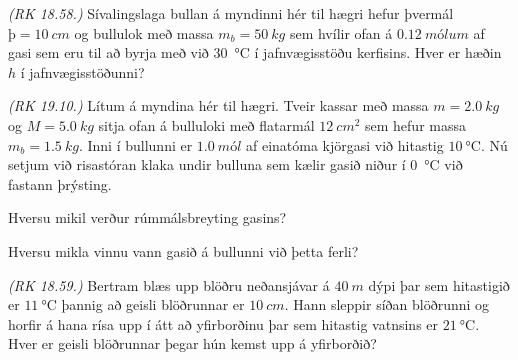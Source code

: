 \ifdefined \wholebook \else\documentclass[oneside]{book}\usepackage{EdlBook}\graphicspath{{figures/}}
\begin{document}
\begin{enumerate}[label = \textbf{Dæmi \thechapter.\arabic*.}]
\begin{minipage}{\linewidth}
\item \textit{(RK 18.58.)} Sívalingslaga bullan á myndinni hér til hægri hefur þvermál $þ = \SI{10}{cm}$ og bullulok með massa $m_b = \SI{50}{kg}$ sem hvílir ofan á $\SI{0.12}{mólum}$ af gasi sem eru til að byrja með við \SI{30}{\celsius} í jafnvægisstöðu kerfisins. Hver er hæðin $h$ í jafnvægisstöðunni?

\item \textit{(RK 19.10.)} Lítum á myndina hér til hægri. Tveir kassar með massa $m = \SI{2.0}{kg}$ og $M = \SI{5.0}{kg}$ sitja ofan á bulluloki með flatarmál $\SI{12}{cm^2}$ sem hefur massa $m_b = \SI{1.5}{kg}$. Inni í bullunni er $\SI{1.0}{mól}$ af einatóma kjörgasi við hitastig $ \SI{10}{\celsius}$. Nú setjum við risastóran klaka undir bulluna sem kælir gasið niður í \SI{0}{\celsius} við fastann þrýsting. \begin{enumerate*}[label = \textbf{(\alph*)}]
\item Hversu mikil verður rúmmálsbreyting gasins?
\item Hversu mikla vinnu vann gasið á bullunni við þetta ferli?
\end{enumerate*}

\item \textit{(RK 18.59.)} Bertram blæs upp blöðru neðansjávar á $\SI{40}{m}$ dýpi þar sem hitastigið er $\SI{11}{\celsius}$ þannig að geisli blöðrunnar er $\SI{10}{cm}$. Hann sleppir síðan blöðrunni og horfir á hana rísa upp í átt að yfirborðinu þar sem hitastig vatnsins er $\SI{21}{\celsius}$. Hver er geisli blöðrunnar þegar hún kemst upp á yfirborðið?

\end{minipage}

\end{enumerate}
\end{document}
